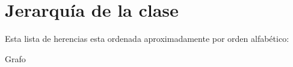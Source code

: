 \section{Jerarquía de la clase}
Esta lista de herencias esta ordenada aproximadamente por orden alfabético\+:\begin{DoxyCompactList}
\item Grafo\begin{DoxyCompactList}
\item {}
\end{DoxyCompactList}
\end{DoxyCompactList}
